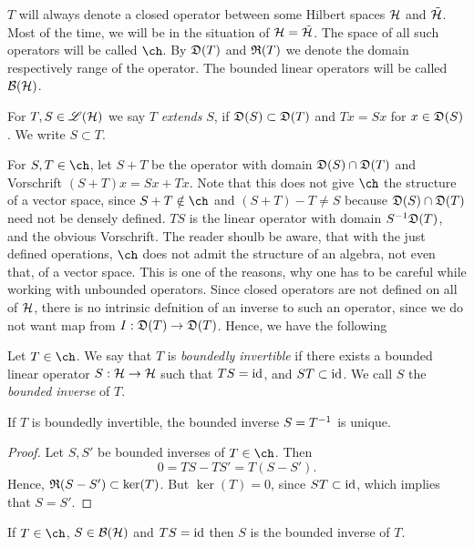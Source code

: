 $T$ will always denote a closed operator between some Hilbert spaces $\mathcal{H}$ and $ \tilde{\mathcal{H}}$. Most of the time, we will be in the situation of $\mathcal{H} = \tilde{\mathcal{H}}$. The space of all such operators will be called $\ch$. By $\mathfrak{D}(T)$ and $\mathfrak{R}(T)$ we denote the domain respectively range of the operator. The bounded linear operators will be called $\mathcal{B}(\mathcal{H})$.
\begin{defi}
  For $T, S \in \mathscr{L}(\mathcal{H})$ we say $T$ \textit{extends} $S$, if $\mathfrak{D}(S)\subset \mathfrak{D}(T)$ and $ Tx = Sx$ for $x \in \mathfrak{D} (S)$. We write $S \subset T$.
\end{defi}
For $S, T \in \ch$, let $S + T$ be the operator with domain $\mathfrak{D}(S) \cap \mathfrak{D}(T)$ and Vorschrift $(S + T)x = Sx + Tx$. Note that this does not give $\ch$ the structure of a vector space, since $S +T \notin \ch$ and  $(S + T) - T \neq S$ because $\mathfrak{D}(S) \cap \mathfrak{D}(T)$ need not be densely defined. $TS$ is the linear operator with domain $S^{-1} \mathfrak{D}(T)$, and the obvious Vorschrift. The reader shoulb be aware, that with the just defined operations, $\ch$ does not admit the structure of an algebra, not even that, of a vector space. This is one of the reasons, why one has to be careful while working with unbounded operators. Since closed operators are not defined on all of $\mathcal{H}$, there is no intrinsic defnition of an inverse to such an operator, since we do not want map from $I: \mathfrak{D}(T) \to \mathfrak{D}(T)$. Hence, we have the following
\begin{defi}
 \cancer Let $T \in \ch$. We say that $T$ is \textit{boundedly invertible} if there exists a bounded linear operator $S: \mathcal{H} \to \mathcal{H}$ such that $TS = \operatorname{id}$, and $ST \subset \operatorname{id}$. We call $S$ the \textit{bounded inverse} of $T$.
\end{defi}

\begin{lem}
 If $T$ is boundedly invertible, the bounded inverse $S= T^{-1}$ is unique. 
\end{lem}

\begin{proof}

 Let $S, S'$ be bounded inverses of $T \in \ch$. Then
 \[
  0 = TS - TS' = T(S - S').
 \]
Hence, $ \mathfrak{R}(S - S') \subset \ker(T)$. But $\ker(T) = 0$, since $ST \subset \operatorname{id}$, which implies that $S = S'$.
\end{proof}


\begin{lem}
 If $T \in \ch$, $S \in \mathcal{B}(\mathcal{H})$ and $ TS = \operatorname{id}$ then $S$ is the bounded inverse of $T$.
\end{lem}

